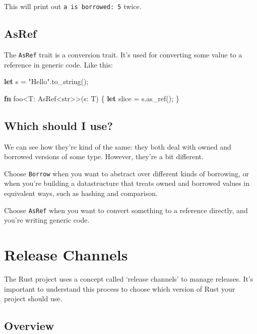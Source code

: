\documentclass[a4paper,]{book}
\newenvironment{Shaded}{\begin{snugshade}}{\end{snugshade}}
\newcommand{\KeywordTok}[1]{\textcolor[rgb]{0.13,0.29,0.53}{\textbf{{#1}}}}
\newcommand{\DataTypeTok}[1]{\textcolor[rgb]{0.13,0.29,0.53}{{#1}}}
\newcommand{\StringTok}[1]{\textcolor[rgb]{0.31,0.60,0.02}{{#1}}}
\newcommand{\NormalTok}[1]{{#1}}
\begin{document}
This will print out \texttt{a\ is\ borrowed:\ 5} twice.

\subsection{AsRef}\label{asref}

The \texttt{AsRef} trait is a conversion trait. It's used for converting
some value to a reference in generic code. Like this:

\begin{Shaded}
\begin{Highlighting}[]
\KeywordTok{let} \NormalTok{s = }\StringTok{"Hello"}\NormalTok{.to_string();}

\KeywordTok{fn} \NormalTok{foo<T: AsRef<}\DataTypeTok{str}\NormalTok{>>(s: T) \{}
    \KeywordTok{let} \NormalTok{slice = s.as_ref();}
\NormalTok{\}}
\end{Highlighting}
\end{Shaded}

\subsection{Which should I use?}\label{which-should-i-use}

We can see how they're kind of the same: they both deal with owned and
borrowed versions of some type. However, they're a bit different.

Choose \texttt{Borrow} when you want to abstract over different kinds of
borrowing, or when you're building a datastructure that treats owned and
borrowed values in equivalent ways, such as hashing and comparison.

Choose \texttt{AsRef} when you want to convert something to a reference
directly, and you're writing generic code.

\section{Release Channels}\label{sec--release-channels}

The Rust project uses a concept called `release channels' to manage
releases. It's important to understand this process to choose which
version of Rust your project should use.

\subsection{Overview}\label{overview}
\end{document}
